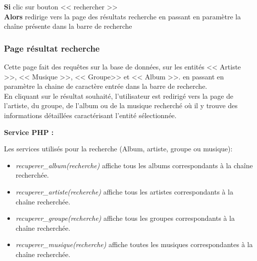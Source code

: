             \begin{paragraphe}
                \textbf{Si} clic sur bouton << rechercher >> \\
                \textbf{Alors} redirige vers la page des résultats recherche en passant en paramètre la chaîne présente dans la barre de recherche
            \end{paragraphe}


        \clearpage

		\subsubsection{Page résultat recherche}

			\begin{paragraphe}
				Cette page fait des requêtes sur la base de données, sur les entités << Artiste >>, << Musique >>, << Groupe>> et << Album >>.
				 en passant en paramètre la chaine de caractère entrée dans la barre de recherche.\\
                En cliquant sur le résultat souhaité, l'utilisateur est redirigé vers la page de l'artiste, du groupe, de l'album ou de la musique
                 recherché où il y trouve des informations détaillées caractérisant l'entité sélectionnée.
            \end{paragraphe}

            \begin{paragraphe}
                \textbf{Service PHP :}
            \end{paragraphe}

            \begin{paragraphe}
                Les services utilisés pour la recherche (Album, artiste, groupe ou musique):
                 \begin{itemize}
                     \item \emph{recuperer\_album(recherche)} affiche tous les albums correspondants à la chaîne recherchée.
                     \item \emph{recuperer\_artiste(recherche)} affiche tous les artistes correspondants à la chaîne recherchée.
                     \item \emph{recuperer\_groupe(recherche)} affiche tous les groupes correspondants à la chaîne recherchée.
                     \item \emph{recuperer\_musique(recherche)} affiche toutes les musiques correspondantes à la chaîne recherchée.
                 \end{itemize}
             \end{paragraphe}

